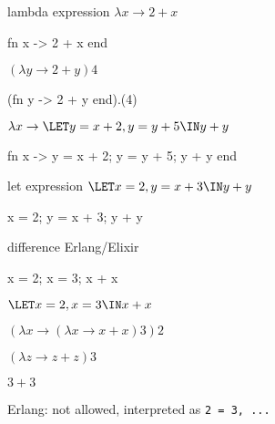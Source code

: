 \begin{frame}{lambda expression}
  $\lambda x \rightarrow 2 + x$
  \pause \hspace{40pt}
  \begin{code}
   fn x -> 2 + x end
  \end{code}

 
  \pause  \vspace{20pt}
  $(\lambda y \rightarrow 2 + y) 4$
  \pause  \hspace{40pt}
  \begin{code}
    (fn y -> 2 + y end).(4)
  \end{code}


  \pause  \vspace{20pt}
  $\lambda x \rightarrow  \LET y = x + 2 , y = y + 5 \IN y + y$ \pause

  \vspace{10pt}\hspace{40pt}
  \begin{code}
    fn x -> y = x + 2; y = y + 5; y + y end
  \end{code}
  
\end{frame}


\begin{frame}{let expression}
  $\LET x = 2, y = x + 3 \IN y + y $
  \pause

  \begin{code}
    x = 2;  y = x + 3;  y + y
  \end{code}


\end{frame}

\begin{frame}{difference Erlang/Elixir}

  \begin{code}
    x = 2; x = 3; x + x
  \end{code}

  \vspace{10pt}\pause
  $\LET x = 2, x = 3 \IN x + x $

  \vspace{10pt}\pause
  $(\lambda x \rightarrow ( \lambda x \rightarrow x + x) 3 ) 2$  

  \vspace{10pt}\pause
  $( \lambda z \rightarrow z + z) 3$

  \vspace{10pt}\pause
  $3 + 3$  
  


  \vspace{30pt}\pause
  Erlang: not allowed, interpreted as {\tt 2 = 3, ...}
  
\end{frame}


